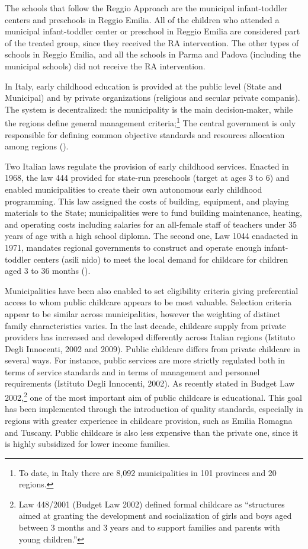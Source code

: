 \documentclass[12pt]{article}
\begin{document}
The schools that follow the Reggio Approach are the municipal infant-toddler centers and preschools in Reggio Emilia. All of the children who attended a municipal infant-toddler center or preschool in Reggio Emilia are considered part of the treated group, since they received the RA intervention. The other types of schools in Reggio Emilia, and all the schools in Parma and Padova (including the municipal schools) did not receive the RA intervention.

In Italy, early childhood education is provided at the public level (State and Municipal) and by private organizations (religious and secular private companis). The system is decentralized: the municipality is the main decision-maker, while the regions define general management criteria;\footnote{To date, in Italy there are 8,092 municipalities in 101 provinces and 20 regions.} The central government is only responsible for defining common objective standards and resources allocation among regions (\cite{Brilli2016}).

Two Italian laws regulate the provision of early childhood services. Enacted in 1968, the law 444 provided for state-run preschools (target at ages 3 to 6) and enabled municipalities to create their own autonomous early childhood programming. This law assigned the costs of building, equipment, and playing materials to the State; municipalities were to fund building maintenance, heating, and operating costs including salaries for an all-female staff of teachers under 35 years of age with a high school diploma. The second one, Law 1044 enadacted in 1971, mandates regional governments to construct and operate enough infant-toddler centers (asili nido) to meet the local demand for childcare for children aged 3 to 36 months (\cite{Brilli2016}).

Municipalities have been also enabled to set eligibility criteria giving preferential access to whom public childcare appears to be most valuable. Selection criteria appear to be similar across municipalities, however the weighting of distinct family characteristics varies. In the last decade, childcare supply from private providers has increased and developed differently across Italian regions (Istituto Degli Innocenti, 2002 and 2009). Public childcare differs from private childcare in several ways. For instance, public services are more strictly regulated both in terms of service standards and in terms of management and personnel requirements (Istituto Degli Innocenti, 2002). As recently stated in Budget Law 2002,\footnote{Law 448/2001 (Budget Law 2002) defined formal childcare as ``structures aimed at granting the development and socialization of girls and boys aged between 3 months and 3 years and to support families and parents with young children.''} one of the most important aim of public childcare is educational. This goal has been implemented through the introduction of quality standards, especially in regions with greater experience in childcare provision, such as Emilia Romagna and Tuscany. Public childcare is also less expensive than the private one, since it is highly subsidized for lower income families.
\end{document}
